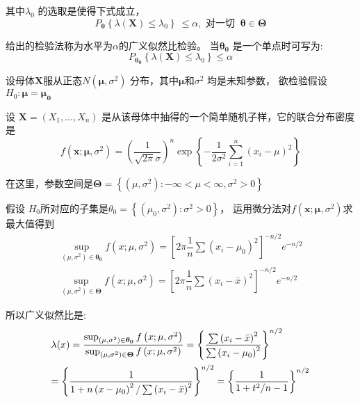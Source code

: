     其中$\lambda_{0}$ 的选取是使得下式成立，
    \begin{equation}
        P_{\boldsymbol{\theta} }\left\{ \lambda(\boldsymbol{X} ) \leq \lambda_{0}\right\} ~ \leq \alpha, \text { 对一切 } ~ \boldsymbol{\theta \in \Theta}
    \end{equation}

    给出的检验法称为水平为$ \alpha $的广义似然比检验。 当$ \boldsymbol{\theta_{0}} $ 是一个单点时可写为:
    $$ P_{\boldsymbol{\theta_0} }\left\{\lambda(\boldsymbol{X}) \leq {\lambda_{0}} \right\} \leq \alpha $$

\begin{myexample}
    设母体$ \boldsymbol{X} $服从正态$ N(\boldsymbol{\mu} ,\sigma^{2} )$ 分布，其中$ \boldsymbol{\mu} $和$ \sigma^{2}$ 均是未知参数，
    欲检验假设 $ H_{0}: \boldsymbol{\mu=\mu_{0}} $

    设  $ \boldsymbol{X} = (X_{1},\ldots,X_{n}) $ 是从该母体中抽得的一个简单随机子样，它的联合分布密度是
    $$ f \left(\boldsymbol{x ; \mu}, \sigma^{2}\right)=\left(\frac{1}{\sqrt{2 \pi} \sigma}\right)^{n} \exp 
          \left\{-\frac{1}{2 \sigma^{2}} \sum_{i=1}^{n}\left(x_{i}-\mu\right)^{2}\right\} $$
        
          在这里，参数空间是$ \boldsymbol{\Theta} = \left\{\left(\mu, \sigma^{2}\right):-\infty<\mu<\infty, \sigma^{2}>0\right\} $

          假设 $ H_0 $所对应的子集是$\theta_{0}=\left\{\left(\mu_{0}, \sigma^{2}\right): \sigma^{2}>0\right\} $，
          运用微分法对$ f\left(\boldsymbol{x ; \mu}, \sigma^{2}\right) $求最大值得到
          $$ \begin{array}{l}
            \sup _{\left(\mu, \sigma^{2}\right) \in \boldsymbol{\theta_{0}}} f\left(x ; \mu, \sigma^{2}\right)
            =\left[2 \pi  \dfrac{1}{n} \sum\left(x_{i}-\mu_{0}\right)^{2}\right]^{-n / 2} e^{-n / 2} \\
            \sup _{\left(\mu, \sigma^{2}\right) \in \boldsymbol{\Theta}} f\left(x ; \mu, \sigma^{2}\right)
            =\left[2 \pi \dfrac{1}{n} \sum\left(x_{i}-\bar{x}\right)^{2}\right]^{-n / 2} e^{-n / 2}
            \end{array} $$
            
     所以广义似然比是:
     \begin{equation}
        \begin{array}{l}
            \lambda(x)=\dfrac{\sup _{\left(\mu, \sigma^{2}\right) \in \boldsymbol{\theta_{0}}} 
            f\left(x ; \mu, \sigma^{2}\right)}{\sup _{\left(\mu, \sigma^{2}\right) \in \boldsymbol{\Theta}} f \left(x ; \mu, \sigma^{2}\right)}
            =\left\{\dfrac{\sum\left(x_{i}-\bar{x}\right)^{2}}{\sum\left(x_{i}-\mu_{0}\right)^{2}}\right\}^{n / 2}  \vspace{0.5em}\\
            =\left\{\dfrac{1}{1+n\left(x-\mu_{0}\right)^{2} / \sum\left(x_{i}-\bar{x}\right)^{2}}\right\}^{n / 2}
            =\left\{\dfrac{1}{1+t^{2} / n-1}\right\}^{n / 2}
         \end{array}
     \end{equation}


\end{myexample}
